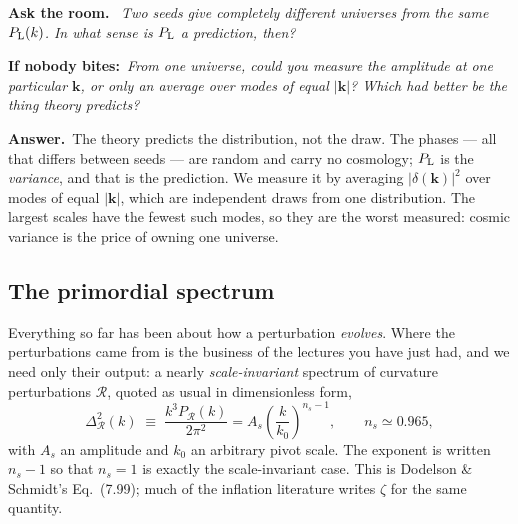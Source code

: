 \documentclass[a4paper,11pt]{article}
\newcommand{\vk}{\bm{k}}
\def\Plin{P_{\rm L}}
\numberwithin{equation}{section}
\newenvironment{quiz}
  {\par\medskip\noindent\begingroup\small\color{RoyalBlue!65!black}%
   \textbf{Ask the room.}\ \itshape}
  {\endgroup\par\medskip}
\newcommand{\nudge}[1]{\upshape\par\smallskip\hspace*{1.2em}\textbf{If nobody bites:}\ \itshape #1}
\newcommand{\answer}[1]{\upshape\par\smallskip\hspace*{1.2em}\textbf{Answer.}\ #1}
\begin{document}
\begin{quiz}
Two seeds give completely different universes from the same $\Plin(k)$. In what
sense is $\Plin$ a prediction, then?
\nudge{From one universe, could you measure the amplitude at one particular
$\vk$, or only an average over modes of equal $|\vk|$? Which had better be the
thing theory predicts?}
\answer{The theory predicts the distribution, not the draw. The phases --- all
that differs between seeds --- are random and carry no cosmology; $\Plin$ is the
\emph{variance}, and that is the prediction. We measure it by averaging
$|\delta(\vk)|^2$ over modes of equal $|\vk|$, which are independent draws from
one distribution. The largest scales have the fewest such modes, so they are the
worst measured: cosmic variance is the price of owning one universe.}
\end{quiz}

\subsection{The primordial spectrum}
\label{sec:primordial}

Everything so far has been about how a perturbation \emph{evolves}. Where the
perturbations came from is the business of the lectures you have just had, and
we need only their output: a nearly \emph{scale-invariant} spectrum of curvature
perturbations $\mathcal{R}$, quoted as usual in dimensionless form,
\begin{equation}
\Delta^2_{\mathcal{R}}(k) \;\equiv\; \frac{k^3 P_{\mathcal{R}}(k)}{2\pi^2}
= A_s\left(\frac{k}{k_0}\right)^{n_s-1} ,
\qquad n_s \simeq 0.965 ,
\label{eq:primordial}
\end{equation}
with $A_s$ an amplitude and $k_0$ an arbitrary pivot scale. The exponent is
written $n_s-1$ so that $n_s = 1$ is exactly the scale-invariant case. This is
Dodelson \& Schmidt's Eq.~(7.99); much of the inflation literature writes $\zeta$
for the same quantity.
\end{document}
